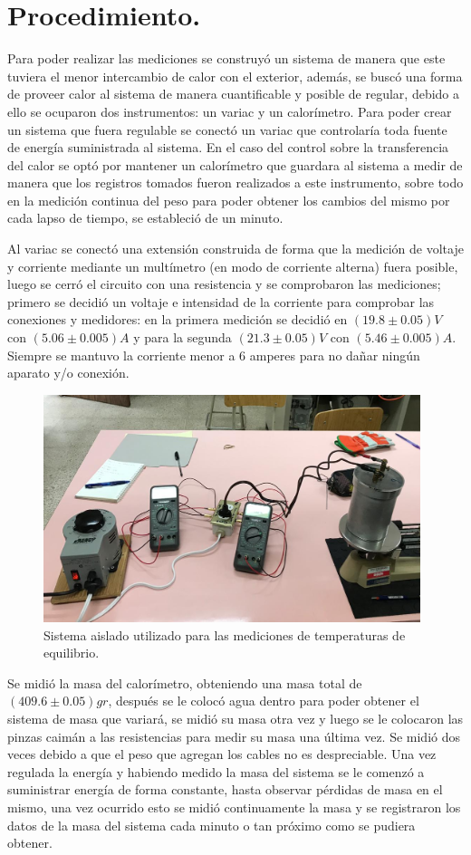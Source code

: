 \documentclass[a4paper]{article}
\begin{document}
\section*{Procedimiento.}
Para poder realizar las mediciones se construyó un sistema de manera que este tuviera el menor intercambio de calor con el exterior, además, se buscó una forma de proveer calor al sistema de manera cuantificable y posible de regular, debido a ello se ocuparon dos instrumentos: un variac y un calorímetro. Para poder crear un sistema que fuera regulable se conectó un variac que controlaría toda fuente de energía suministrada al sistema. En el caso del control sobre la transferencia del calor se optó por mantener un calorímetro que guardara al sistema a medir de manera que los registros tomados fueron realizados a este instrumento, sobre todo en la medición continua del peso para poder obtener los cambios del mismo por cada lapso de tiempo, se estableció de un minuto.

Al variac se conectó una extensión construida de forma que la medición de voltaje y corriente mediante un multímetro (en modo de corriente alterna) fuera posible, luego se cerró el circuito con una resistencia y se comprobaron las mediciones; primero se decidió un voltaje e intensidad de la corriente para comprobar las conexiones y medidores: en la primera medición se decidió en $(19.8\pm0.05)V$ con $(5.06\pm0.005)A$ y para la segunda $(21.3\pm0.05)V$ con $(5.46\pm0.005)A$. Siempre se mantuvo la corriente menor a 6 amperes para no dañar ningún aparato y/o conexión.

\begin{figure}[H]
    \centering
    \includegraphics[width=11cm]{expe.png}
    \caption{Sistema aislado utilizado para las mediciones de temperaturas de equilibrio.}
\end{figure}

Se midió la masa del calorímetro, obteniendo una masa total de $(409.6\pm0.05)gr$, después se le colocó agua dentro para poder obtener el sistema de masa que variará, se midió su masa otra vez y luego se le colocaron las pinzas caimán a las resistencias para medir su masa una última vez. Se midió dos veces debido a que el peso que agregan los cables no es despreciable. Una vez regulada la energía y habiendo medido la masa del sistema se le comenzó a suministrar energía de forma constante, hasta observar pérdidas de masa en el mismo, una vez ocurrido esto se midió continuamente la masa y se registraron los datos de la masa del sistema cada minuto o tan próximo como se pudiera obtener.
\end{document}
